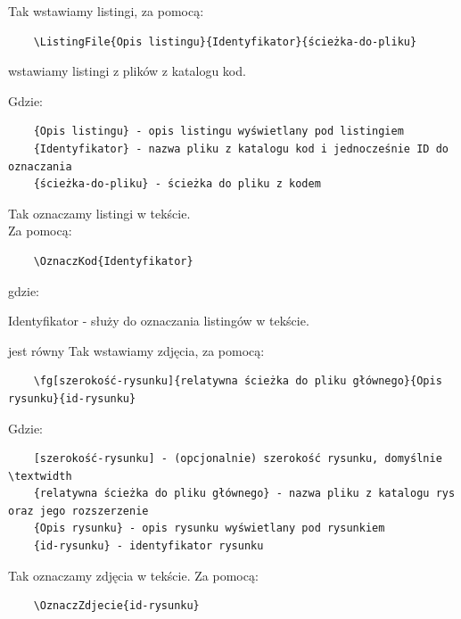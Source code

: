 


Tak wstawiamy listingi, za pomocą:

\begin{verbatim}
	\ListingFile{Opis listingu}{Identyfikator}{ścieżka-do-pliku}
\end{verbatim}

wstawiamy listingi z plików z katalogu kod.

Gdzie:
\begin{verbatim}
	{Opis listingu} - opis listingu wyświetlany pod listingiem
	{Identyfikator} - nazwa pliku z katalogu kod i jednocześnie ID do oznaczania
	{ścieżka-do-pliku} - ścieżka do pliku z kodem
\end{verbatim}

Tak oznaczamy listingi  w tekście.\\Za pomocą:

\begin{verbatim}
	\OznaczKod{Identyfikator}
\end{verbatim}

gdzie:

Identyfikator - służy do oznaczania listingów w tekście.

\clearpage



jest równy
\clearpage
Tak wstawiamy zdjęcia, za pomocą:

\begin{verbatim}
	\fg[szerokość-rysunku]{relatywna ścieżka do pliku głównego}{Opis rysunku}{id-rysunku} 
\end{verbatim}

Gdzie:
\begin{verbatim}
	[szerokość-rysunku] - (opcjonalnie) szerokość rysunku, domyślnie \textwidth
	{relatywna ścieżka do pliku głównego} - nazwa pliku z katalogu rys oraz jego rozszerzenie
	{Opis rysunku} - opis rysunku wyświetlany pod rysunkiem
	{id-rysunku} - identyfikator rysunku
\end{verbatim}

Tak oznaczamy zdjęcia  w tekście. Za pomocą:

\begin{verbatim}
	\OznaczZdjecie{id-rysunku}
\end{verbatim}
